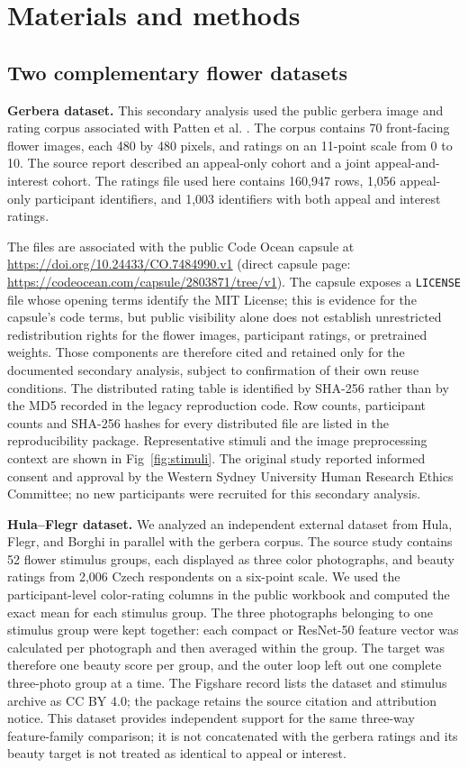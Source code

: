 \documentclass[10pt,letterpaper]{article}
\begin{document}
\section*{Materials and methods}
\subsection*{Two complementary flower datasets}
\noindent\textbf{Gerbera dataset.} This secondary analysis used the public gerbera image and rating corpus associated with Patten et al. \cite{patten2024}. The corpus contains 70 front-facing flower images, each 480 by 480 pixels, and ratings on an 11-point scale from 0 to 10. The source report described an appeal-only cohort and a joint appeal-and-interest cohort. The ratings file used here contains 160,947 rows, 1,056 appeal-only participant identifiers, and 1,003 identifiers with both appeal and interest ratings.

The files are associated with the public Code Ocean capsule at \url{https://doi.org/10.24433/CO.7484990.v1} (direct capsule page: \url{https://codeocean.com/capsule/2803871/tree/v1}). The capsule exposes a \texttt{LICENSE} file whose opening terms identify the MIT License; this is evidence for the capsule's code terms, but public visibility alone does not establish unrestricted redistribution rights for the flower images, participant ratings, or pretrained weights. Those components are therefore cited and retained only for the documented secondary analysis, subject to confirmation of their own reuse conditions. The distributed rating table is identified by SHA-256 rather than by the MD5 recorded in the legacy reproduction code. Row counts, participant counts and SHA-256 hashes for every distributed file are listed in the reproducibility package. Representative stimuli and the image preprocessing context are shown in Fig~\ref{fig:stimuli}. The original study reported informed consent and approval by the Western Sydney University Human Research Ethics Committee; no new participants were recruited for this secondary analysis.

\noindent\textbf{Hula--Flegr dataset.} We analyzed an independent external dataset from Hula, Flegr, and Borghi \cite{hulaflegr2016,hulaflegr2016data} in parallel with the gerbera corpus. The source study contains 52 flower stimulus groups, each displayed as three color photographs, and beauty ratings from 2,006 Czech respondents on a six-point scale. We used the participant-level color-rating columns in the public workbook and computed the exact mean for each stimulus group. The three photographs belonging to one stimulus group were kept together: each compact or ResNet-50 feature vector was calculated per photograph and then averaged within the group. The target was therefore one beauty score per group, and the outer loop left out one complete three-photo group at a time. The Figshare record lists the dataset and stimulus archive as CC BY 4.0; the package retains the source citation and attribution notice. This dataset provides independent support for the same three-way feature-family comparison; it is not concatenated with the gerbera ratings and its beauty target is not treated as identical to appeal or interest.
\end{document}
